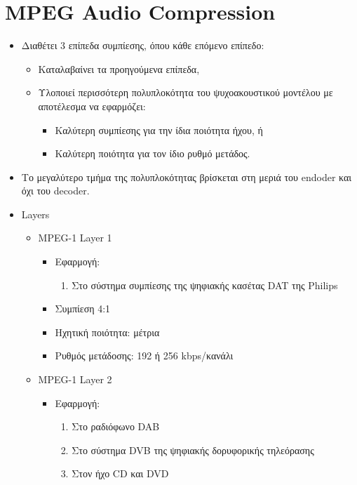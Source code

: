 \documentclass[a4paper,12pt]{article}
\begin{document}
\newpage\section{MPEG Audio Compression}
\begin{itemize}
    \item Διαθέτει 3 επίπεδα συμπίεσης, όπου κάθε επόμενο επίπεδο:
    \begin{itemize}
        \item Καταλαβαίνει τα προηγούμενα επίπεδα,
        \item Υλοποιεί περισσότερη πολυπλοκότητα του ψυχοακουστικού μοντέλου με αποτέλεσμα
        να εφαρμόζει:
        \begin{itemize}
            \item Καλύτερη συμπίεσης για την ίδια ποιότητα ήχου, ή
            \item Καλύτερη ποιότητα για τον ίδιο ρυθμό μετάδος.
        \end{itemize}
    \end{itemize}
    \item Το μεγαλύτερο τμήμα της πολυπλοκότητας βρίσκεται στη μεριά του endoder και όχι του
    decoder.
    \item Layers
    \begin{itemize}
        \item MPEG-1 Layer 1
        \begin{itemize}
            \item Εφαρμογή:
            \begin{enumerate}
                \item Στο σύστημα συμπίεσης της ψηφιακής κασέτας DAT της Philips
            \end{enumerate}
            \item Συμπίεση 4:1
            \item Ηχητική ποιότητα: μέτρια
            \item Ρυθμός μετάδοσης: 192 ή 256 kbps/κανάλι
        \end{itemize}
        \item MPEG-1 Layer 2
        \begin{itemize}
            \item Εφαρμογή:
            \begin{enumerate}
                \item Στο ραδιόφωνο DAB
                \item Στο σύστημα DVB της ψηφιακής δορυφορικής τηλεόρασης
                \item Στον ήχο CD και DVD

\end{enumerate}
\end{itemize}
\end{itemize}
\end{itemize}
\end{document}
